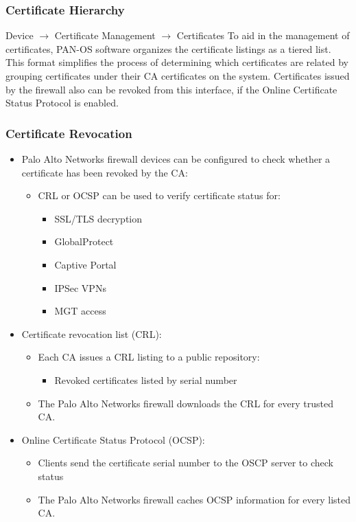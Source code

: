 \subsubsection{Certificate Hierarchy}
Device $\rightarrow$ Certificate Management $\rightarrow$ Certificates
To aid in the management of certificates, PAN-OS software organizes the certificate listings as a tiered list.
This format simplifies the process of determining which certificates are related by grouping certificates under their CA certificates on the system.
Certificates issued by the firewall also can be revoked from this interface, if the Online Certificate Status Protocol is enabled.

\subsubsection{Certificate Revocation}
\begin{itemize}
    \item Palo Alto Networks firewall devices can be configured to check whether a certificate has been revoked by the CA:
        \begin{itemize}
            \item CRL or OCSP can be used to verify certificate status for:
                \begin{itemize}
                    \item SSL/TLS decryption
                    \item GlobalProtect
                    \item Captive Portal
                    \item IPSec VPNs
                    \item MGT access
                \end{itemize}
        \end{itemize}
    \item Certificate revocation list (CRL):
        \begin{itemize}
            \item Each CA issues a CRL listing to a public repository:
                \begin{itemize}
                    \item Revoked certificates listed by serial number
                \end{itemize}
            \item The Palo Alto Networks firewall downloads the CRL for every trusted CA.
        \end{itemize}
    \item Online Certificate Status Protocol (OCSP):
        \begin{itemize}
            \item Clients send the certificate serial number to the OSCP server to check status
            \item The Palo Alto Networks firewall caches OCSP information for every listed CA.
        \end{itemize}
\end{itemize}

